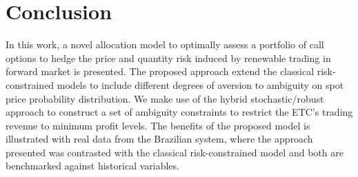 \section{Conclusion}
\label{Conclusions}

	In this work, a novel allocation model to optimally assess a portfolio of call options to hedge the price and quantity risk induced by renewable trading in forward market is presented. The proposed approach extend the classical risk-constrained models to include different degrees of aversion to ambiguity on spot price probability distribution. We make use of the hybrid stochastic/robust approach to construct a set of ambiguity constraints to restrict the ETC's trading revenue to minimum profit levels. The benefits of the proposed model is illustrated with real data from the Brazilian system, where the approach presented was contrasted with the classical risk-constrained model and both are benchmarked against historical variables.